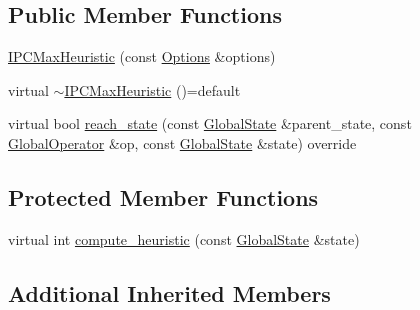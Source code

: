 \subsection*{Public Member Functions}
\begin{DoxyCompactItemize}
\item 
\hyperlink{classIPCMaxHeuristic_a45c59b4e790edfaa1093dad49efc0d51}{I\-P\-C\-Max\-Heuristic} (const \hyperlink{classOptions}{Options} \&options)
\item 
virtual \hyperlink{classIPCMaxHeuristic_a3e1a24f61bdb61d5c44faa06c61c0dab}{$\sim$\-I\-P\-C\-Max\-Heuristic} ()=default
\item 
virtual bool \hyperlink{classIPCMaxHeuristic_af8a5b52235129361ec4721e58c7005ea}{reach\-\_\-state} (const \hyperlink{classGlobalState}{Global\-State} \&parent\-\_\-state, const \hyperlink{classGlobalOperator}{Global\-Operator} \&op, const \hyperlink{classGlobalState}{Global\-State} \&state) override
\end{DoxyCompactItemize}
\subsection*{Protected Member Functions}
\begin{DoxyCompactItemize}
\item 
virtual int \hyperlink{classIPCMaxHeuristic_af6c11caf91d44f3af0d4bacc04787908}{compute\-\_\-heuristic} (const \hyperlink{classGlobalState}{Global\-State} \&state)
\end{DoxyCompactItemize}
\subsection*{Additional Inherited Members}


